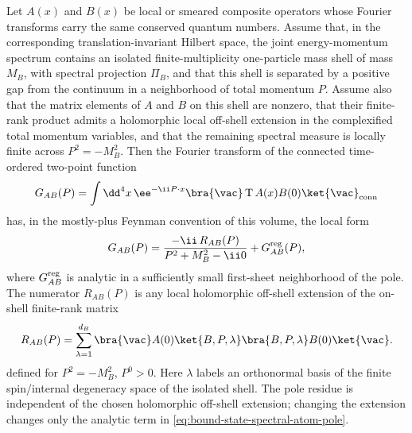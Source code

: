 \begin{theorem}
\label{thm:bound-state-spectral-atom-first-sheet-pole}
Let \(A(x)\) and \(B(x)\) be local or smeared composite operators whose
Fourier transforms carry the same conserved quantum numbers.  Assume that, in
the corresponding translation-invariant Hilbert space, the joint
energy-momentum spectrum contains an isolated finite-multiplicity
one-particle mass shell of mass \(M_B\), with spectral projection
\(\Pi_B\), and that this shell is separated by a positive gap from the
continuum in a neighborhood of total momentum \(P\).  Assume also that the
matrix elements of \(A\) and \(B\) on this shell are nonzero, that their
finite-rank product admits a holomorphic local off-shell extension in the
complexified total momentum variables, and that the remaining spectral
measure is locally finite across \(P^2=-M_B^2\).  Then
the Fourier transform of the connected time-ordered two-point function
\[
  G_{AB}(P)
  =
  \int \dd^4x\,\ee^{-\ii P\cdot x}
  \bra{\vac}\operatorname T A(x)B(0)\ket{\vac}_{\rm conn}
\]
has, in the mostly-plus Feynman convention of this volume, the local form
\begin{equation}
  G_{AB}(P)
  =
  \frac{-\ii\,R_{AB}(P)}
       {P^2+M_B^2-\ii0}
  +
  G_{AB}^{\rm reg}(P),
  \label{eq:bound-state-spectral-atom-pole}
\end{equation}
where \(G_{AB}^{\rm reg}\) is analytic in a sufficiently small first-sheet
neighborhood of the pole.  The numerator \(R_{AB}(P)\) is any local
holomorphic off-shell extension of the on-shell finite-rank matrix
\begin{equation}
  R_{AB}(P)
  =
  \sum_{\lambda=1}^{d_B}
  \bra{\vac}A(0)\ket{B,P,\lambda}
  \bra{B,P,\lambda}B(0)\ket{\vac}.
  \label{eq:bound-state-spectral-residue}
\end{equation}
defined for \(P^2=-M_B^2\), \(P^0>0\).  Here \(\lambda\) labels an
orthonormal basis of the finite spin/internal degeneracy space of the
isolated shell.  The pole residue is independent of the chosen holomorphic
off-shell extension; changing the extension changes only the analytic term
in \eqref{eq:bound-state-spectral-atom-pole}.
\end{theorem}

